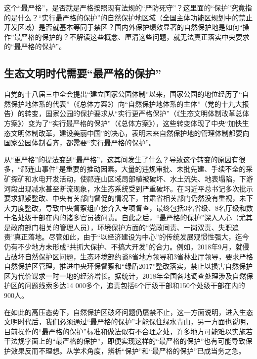 \documentclass[]{book}
\begin{document}
这个``最严格''，是否就是严格按照现有法规的``严防死守''？这里面的``保护''究竟指的是什么？``实行最严格的保护''的自然保护地区域（全国主体功能区规划中的禁止开发区域）是否就基本等同于禁区？国内外保护绩效显著的自然保护地是如何``操作''最严格的保护的？不解读这些概念、厘清这些问题，就无法真正落实中央要求的``最严格的保护''。

\hypertarget{ux751fux6001ux6587ux660eux65f6ux4ee3ux9700ux8981ux6700ux4e25ux683cux7684ux4fddux62a4}{%
\subsection{生态文明时代需要``最严格的保护''}\label{ux751fux6001ux6587ux660eux65f6ux4ee3ux9700ux8981ux6700ux4e25ux683cux7684ux4fddux62a4}}

自党的十八届三中全会提出``建立国家公园体制''以来，国家公园的地位经历了``自然保护地体系的代表''（《总体方案》）向``自然保护地体系的主体''（党的十九大报告）的转变，国家公园的保护要求从``实行更严格保护''（《生态文明体制改革总体方案》）变为了``实行最严格的保护''（《总体方案》），这些转变体现了中央``加快生态文明体制改革，建设美丽中国''的决心，表明未来自然保护地的管理体制都要向国家公园体制看齐，都需要``实行最严格的保护''。

从``更严格''的提法变到``最严格''，这其间发生了什么？导致这个转变的原因有很多，``祁连山事件''是重要的推动因素。大量的违规审批、未批先建、手续不全的采矿探矿和水电开发活动，使祁连山区域局部植被破坏、水土流失、地表塌陷，下游河段出现减水甚至断流现象，水生态系统受到严重破坏。在习近平总书记多次批示要求抓紧整改、中央有关部门督促的情况下，甘肃省相关部门仍然没有重视，未下大力度整改，导致中央督察组直接介入专项督查，最终包括3名省级、8名厅级和数十名处级干部在内的诸多官员被问责。自此之后，``最严格的保护''深入人心（尤其是政府部门相关的管理人员），环境保护方面的``党政同责、一岗双责、失职追责''真正落地。尽管如此，由于``以经济建设为中心''的传统发展观惯性强大，迄今仍有不少地方未形成``共抓大保护、不搞大开发''的合力。例如，2018年9月，就侵占破坏自然保护区问题，生态环境部约谈8省地方领导和3省林业厅领导，要求严格自然保护区管理，推进中央环保督察和``绿盾2017''整改落实，禁止以损害自然保护区为代价谋求一时一地的经济增长。据统计，2018年全国各地调查处理涉及自然保护区的问题线索多达14 000多个，追责包括6个厅级干部和150个处级干部在内的900人。

在如此的高压态势下，自然保护区破坏问题仍屡禁不止，这一方面说明，进入生态文明时代后，我们必须通过``最严格的保护''才能保住绿水青山，另一方面也说明，目前操作的``最严格的保护''标准和做法似有不合理之处，许多地方可能难以实施若干法规字面上的``最严格的保护''，即便实现这样的``最严格的保护''也有可能导致保护效果反而不理想。从学术角度，辨析``保护''和``最严格的保护''已成当务之急。
\end{document}
